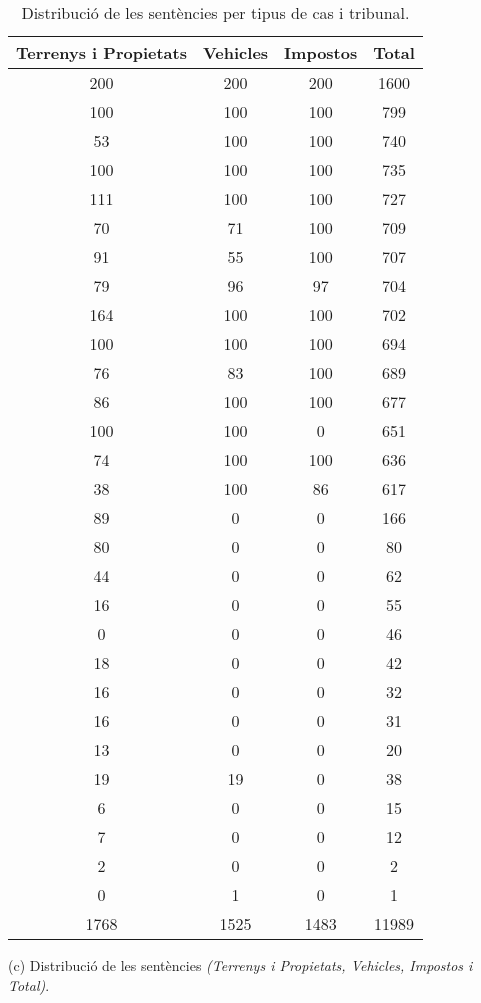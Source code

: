   \begin{table}[H]
    \centering
  \begin{tabular}{cccc}
    \toprule
      \textbf{Terrenys i Propietats} &
      \textbf{Vehicles} &
      \textbf{Impostos} &
      \textbf{Total} \\
      \midrule
    200 & 200 & 200 & 1600 \\
    100 & 100 & 100 & 799 \\
    53 & 100 & 100 & 740 \\
    100 & 100 & 100 & 735 \\
    111 & 100 & 100 & 727 \\
    70 & 71 & 100 & 709 \\
    91 & 55 & 100 & 707 \\
    79 & 96 & 97 & 704 \\
    164 & 100 & 100 & 702 \\
    100 & 100 & 100 & 694 \\
    76 & 83 & 100 & 689 \\
    86 & 100 & 100 & 677 \\
    100 & 100 & 0 & 651 \\
    74 & 100 & 100 & 636 \\
    38 & 100 & 86 & 617 \\
    89 & 0 & 0 & 166 \\
    80 & 0 & 0 & 80 \\
    44 & 0 & 0 & 62 \\
    16 & 0 & 0 & 55 \\
    0 & 0 & 0 & 46 \\
    18 & 0 & 0 & 42 \\
    16 & 0 & 0 & 32 \\
    16 & 0 & 0 & 31 \\
    13 & 0 & 0 & 20 \\
    19 & 19 & 0 & 38 \\
    6 & 0 & 0 & 15 \\
    7 & 0 & 0 & 12 \\
    2 & 0 & 0 & 2 \\
    0 & 1 & 0 & 1 \\
    1768 & 1525 & 1483 & 11989 \\
    \bottomrule
      \end{tabular}
    \captionsetup{font=small}
    \caption*{(c) Distribució de les sentències \textit{(Terrenys i Propietats, Vehicles, Impostos i Total)}.}
    \captionsetup{font=normalsize}
  \caption{Distribució de les sentències per tipus de cas i tribunal.}
  \label{tab:distribucio_cas_tribunal}
\end{table}
    